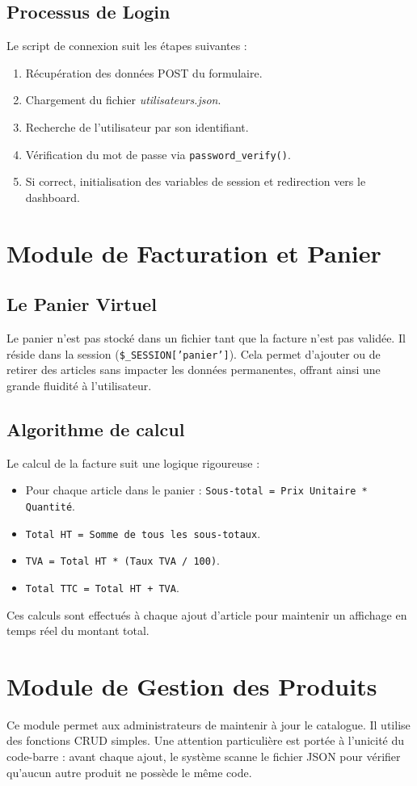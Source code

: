 \documentclass[12pt,a4paper]{report}
\begin{document}
\subsection{Processus de Login}
Le script de connexion suit les étapes suivantes :
\begin{enumerate}
    \item Récupération des données POST du formulaire.
    \item Chargement du fichier \textit{utilisateurs.json}.
    \item Recherche de l'utilisateur par son identifiant.
    \item Vérification du mot de passe via \texttt{password\_verify()}.
    \item Si correct, initialisation des variables de session et redirection vers le dashboard.
\end{enumerate}

\section{Module de Facturation et Panier}
\subsection{Le Panier Virtuel}
Le panier n'est pas stocké dans un fichier tant que la facture n'est pas validée. Il réside dans la session (\texttt{\$\_SESSION['panier']}). Cela permet d'ajouter ou de retirer des articles sans impacter les données permanentes, offrant ainsi une grande fluidité à l'utilisateur.

\subsection{Algorithme de calcul}
Le calcul de la facture suit une logique rigoureuse :
\begin{itemize}
    \item Pour chaque article dans le panier : \texttt{Sous-total = Prix Unitaire * Quantité}.
    \item \texttt{Total HT = Somme de tous les sous-totaux}.
    \item \texttt{TVA = Total HT * (Taux TVA / 100)}.
    \item \texttt{Total TTC = Total HT + TVA}.
\end{itemize}
Ces calculs sont effectués à chaque ajout d'article pour maintenir un affichage en temps réel du montant total.

\section{Module de Gestion des Produits}
Ce module permet aux administrateurs de maintenir à jour le catalogue. Il utilise des fonctions CRUD simples. Une attention particulière est portée à l'unicité du code-barre : avant chaque ajout, le système scanne le fichier JSON pour vérifier qu'aucun autre produit ne possède le même code.
\end{document}

